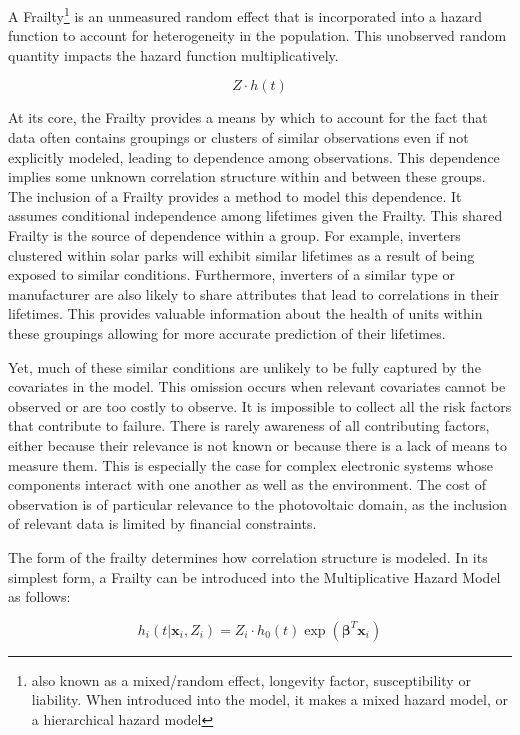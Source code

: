 A Frailty\footnote{also known as a mixed/random effect, longevity factor, susceptibility or liability. When introduced into the model, it makes a mixed hazard model, or a hierarchical hazard model} is an unmeasured random effect that is incorporated into a hazard function to account for heterogeneity in the population\cite{Hosmer2008}. This unobserved random quantity impacts the hazard function multiplicatively.

$$ Z\cdot h(t) $$

At its core, the Frailty provides a means by which to account for the fact that data often contains groupings or clusters of similar observations even if not explicitly modeled, leading to dependence among observations. This dependence implies some unknown correlation structure within and between these groups. The inclusion of a Frailty provides a method to model this dependence. It assumes conditional independence among lifetimes given the Frailty. This shared Frailty is the source of dependence within a group\cite{Wienke2010}. For example, inverters clustered within solar parks will exhibit similar lifetimes as a result of being exposed to similar conditions. Furthermore, inverters of a similar type or manufacturer are also likely to share attributes that lead to correlations in their lifetimes. This provides valuable information about the health of units within these groupings allowing for more accurate prediction of their lifetimes.

Yet, much of these similar conditions are unlikely to be fully captured by the covariates in the model. This omission occurs when relevant covariates cannot be observed or are too costly to observe. It is impossible to collect all the risk factors that contribute to failure. There is rarely awareness of all contributing factors, either because their relevance is not known or because there is a lack of means to measure them. This is especially the case for complex electronic systems whose components interact with one another as well as the environment. The cost of observation is of particular relevance to the photovoltaic domain, as the inclusion of relevant data is limited by financial constraints.

The form of the frailty determines how correlation structure is modeled. In its simplest form, a Frailty can be introduced into the Multiplicative Hazard Model as follows:

$$ h_i(t|\textbf{x}_i, Z_i) = Z_i \cdot h_0(t) \exp(\boldsymbol\beta^T \textbf{x}_i)  $$


